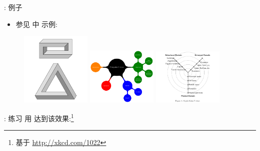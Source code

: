 \documentclass{beamer}
\begin{document}
\begin{frame}[fragile]{\insertsection: 例子}
\begin{itemize}
\item 参见  中 \tikzname{} 示例:
\end{itemize}
\begin{figure}
\href{http://texample.net/tikz/examples/escher-brick-penrose-triangle/}{%
  \includegraphics[width=0.3\textwidth]{escher-brick-penrose-triangle}}
\href{http://texample.net/tikz/examples/computer-science-mindmap/}{%
  \includegraphics[width=0.3\textwidth]{computer-science-mindmap}}
\href{http://texample.net/tikz/examples/gajski-kuhn-y-chart/}{%
  \includegraphics[width=0.3\textwidth]{gajski-kuhn-y-chart}}
\end{figure}
\end{frame}

\begin{frame}[fragile]{\insertsection: 练习}
用 \tikzname 达到该效果:\footnote{基于 \url{http://xkcd.com/1022}}
\begin{figure}

\end{figure}
\end{frame}
\end{document}
